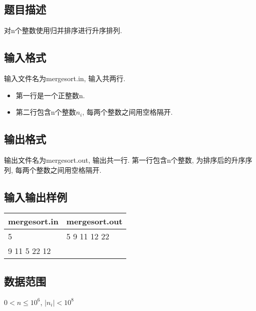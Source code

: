 \subsection{题目描述}
对n个整数使用归并排序进行升序排列.
\subsection{输入格式}
输入文件名为mergesort.in, 输入共两行.
\begin{itemize}
	\item 第一行是一个正整数n.
	\item 第二行包含n个整数$n_i$, 每两个整数之间用空格隔开.
\end{itemize}
\subsection{输出格式}
输出文件名为mergesort.out, 输出共一行.
第一行包含n个整数, 为排序后的升序序列, 每两个整数之间用空格隔开.
\subsection{输入输出样例}
\begin{table}[h!]
	\centering
	\begin{tabular}{|l|l|}
		\hline
		mergesort.in & mergesort.out \\
		\hline
		5            & 5 9 11 12 22  \\
		9 11 5 22 12 & ~             \\
		\hline
	\end{tabular}
\end{table}
\subsection{数据范围}
$ 0 < n \leq 10^6 $,
$ | n_i | < 10^8 $
